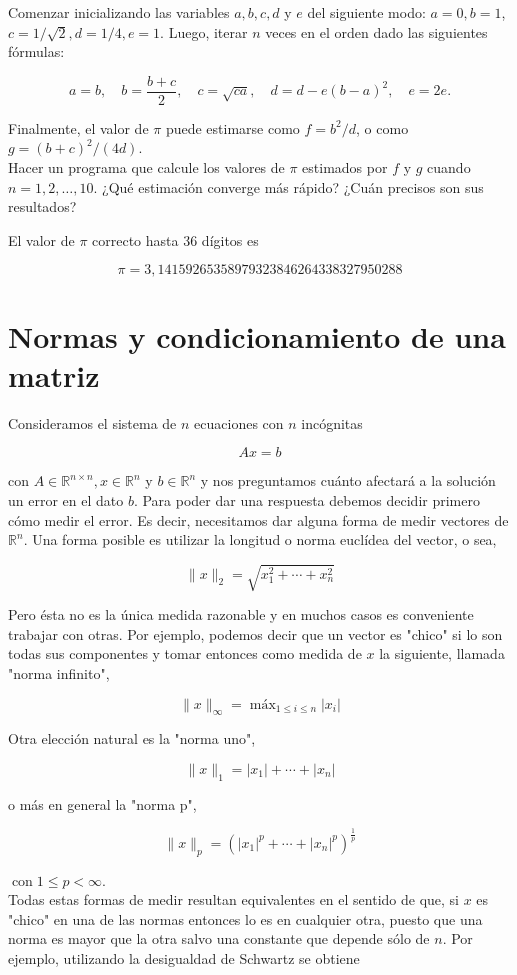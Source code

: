 \documentclass[10pt]{book}
\begin{document}
Comenzar inicializando las variables $a, b, c, d$ y $e$ del siguiente modo: $a=0, b=1$, $c=1 / \sqrt{2}, d=1 / 4, e=1$. Luego, iterar $n$ veces en el orden dado las siguientes fórmulas:

$$
a=b, \quad b=\frac{b+c}{2}, \quad c=\sqrt{c a}, \quad d=d-e(b-a)^{2}, \quad e=2 e .
$$

Finalmente, el valor de $\pi$ puede estimarse como $f=b^{2} / d$, o como $g=(b+c)^{2} /(4 d)$.\\
Hacer un programa que calcule los valores de $\pi$ estimados por $f$ y $g$ cuando $n= 1,2, \ldots, 10$. ¿Qué estimación converge más rápido? ¿Cuán precisos son sus resultados?

El valor de $\pi$ correcto hasta 36 dígitos es

$$
\pi=3,14159265358979323846264338327950288
$$

\chapter{Normas y condicionamiento de una matriz}
Consideramos el sistema de $n$ ecuaciones con $n$ incógnitas

$$
A x=b
$$

con $A \in \mathbb{R}^{n \times n}, x \in \mathbb{R}^{n}$ y $b \in \mathbb{R}^{n}$ y nos preguntamos cuánto afectará a la solución un error en el dato $b$. Para poder dar una respuesta debemos decidir primero cómo medir el error. Es decir, necesitamos dar alguna forma de medir vectores de $\mathbb{R}^{n}$. Una forma posible es utilizar la longitud o norma euclídea del vector, o sea,

$$
\|x\|_{2}=\sqrt{x_{1}^{2}+\cdots+x_{n}^{2}}
$$

Pero ésta no es la única medida razonable y en muchos casos es conveniente trabajar con otras. Por ejemplo, podemos decir que un vector es "chico" si lo son todas sus componentes y tomar entonces como medida de $x$ la siguiente, llamada "norma infinito",

$$
\|x\|_{\infty}=\operatorname{máx}_{1 \leq i \leq n}\left|x_{i}\right|
$$

Otra elección natural es la "norma uno",

$$
\|x\|_{1}=\left|x_{1}\right|+\cdots+\left|x_{n}\right|
$$

o más en general la "norma p",

$$
\|x\|_{p}=\left(\left|x_{1}\right|^{p}+\cdots+\left|x_{n}\right|^{p}\right)^{\frac{1}{p}}
$$

$\operatorname{con} 1 \leq p<\infty$.\\
Todas estas formas de medir resultan equivalentes en el sentido de que, si $x$ es "chico" en una de las normas entonces lo es en cualquier otra, puesto que una norma es mayor que la otra salvo una constante que depende sólo de $n$. Por ejemplo, utilizando la desigualdad de Schwartz se obtiene
\end{document}
